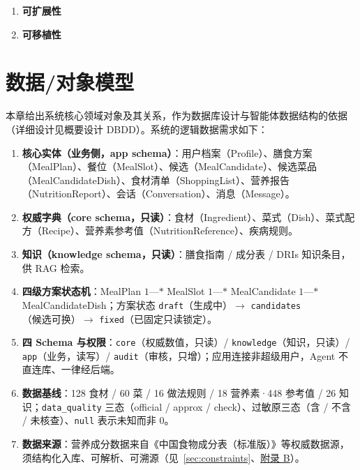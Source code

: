 \documentclass[12pt,a4paper]{ctexart}
\begin{document}
\begin{enumerate}
\item \textbf{可扩展性}
\item \textbf{可移植性}
\end{enumerate}

\section{数据/对象模型}\label{sec:data-model}

本章给出系统核心领域对象及其关系，作为数据库设计与智能体数据结构的依据（详细设计见概要设计 DBDD）。系统的逻辑数据需求如下：

\begin{enumerate}
\item \textbf{核心实体（业务侧，app schema）}：用户档案（Profile）、膳食方案（MealPlan）、餐位（MealSlot）、候选（MealCandidate）、候选菜品（MealCandidateDish）、食材清单（ShoppingList）、营养报告（NutritionReport）、会话（Conversation）、消息（Message）。
\item \textbf{权威字典（core schema，只读）}：食材（Ingredient）、菜式（Dish）、菜式配方（Recipe）、营养素参考值（NutritionReference）、疾病规则。
\item \textbf{知识（knowledge schema，只读）}：膳食指南 / 成分表 / DRIs 知识条目，供 RAG 检索。
\item \textbf{四级方案状态机}：MealPlan $1$---$*$ MealSlot $1$---$*$ MealCandidate $1$---$*$ MealCandidateDish；方案状态 \texttt{draft}（生成中）$\rightarrow$ \texttt{candidates}（候选可换）$\rightarrow$ \texttt{fixed}（已固定只读锁定）。
\item \textbf{四 Schema 与权限}：\texttt{core}（权威数值，只读）/ \texttt{knowledge}（知识，只读）/ \texttt{app}（业务，读写）/ \texttt{audit}（审核，只增）；应用连接非超级用户，Agent 不直连库、一律经后端。
\item \textbf{数据基线}：128 食材 / 60 菜 / 16 做法规则 / 18 营养素·448 参考值 / 26 知识；\texttt{data\_quality} 三态（official / approx / check）、过敏原三态（含 / 不含 / 未核查）、\texttt{null} 表示未知而非 0。
\item \textbf{数据来源}：营养成分数据来自《中国食物成分表（标准版）》等权威数据源，须结构化入库、可解析、可溯源（见~\ref{sec:constraints}、\hyperref[appendix:b]{附录 B}）。
\end{enumerate}
\end{document}
